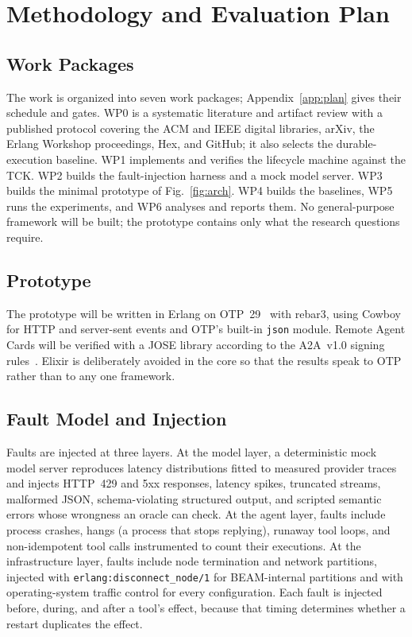 \documentclass[conference,letterpaper]{IEEEtran}
\newcommand{\code}[1]{\texttt{#1}}
\begin{document}
\section{Methodology and Evaluation Plan}\label{sec:method}

\subsection{Work Packages}

The work is organized into seven work packages; Appendix~\ref{app:plan}
gives their schedule and gates. WP0 is a systematic literature and artifact
review with a published protocol covering the ACM and IEEE digital
libraries, arXiv, the Erlang Workshop proceedings, Hex, and GitHub; it also
selects the durable-execution baseline. WP1 implements and verifies the
lifecycle machine against the TCK. WP2 builds the fault-injection harness
and a mock model server. WP3 builds the minimal prototype of
Fig.~\ref{fig:arch}. WP4 builds the baselines, WP5 runs the experiments,
and WP6 analyses and reports them. No general-purpose framework will be
built; the prototype contains only what the research questions require.

\subsection{Prototype}

The prototype will be written in Erlang on OTP~29~\cite{otp29} with rebar3,
using Cowboy for HTTP and server-sent events and OTP's built-in \code{json}
module. Remote Agent Cards will be verified with a JOSE library according to
the A2A~v1.0 signing rules~\cite{aaif2026}. Elixir is deliberately avoided
in the core so that the results speak to OTP rather than to any one
framework.

\subsection{Fault Model and Injection}\label{sec:faults}

Faults are injected at three layers. At the model layer, a deterministic
mock model server reproduces latency distributions fitted to measured
provider traces and injects HTTP~429 and 5xx responses, latency spikes,
truncated streams, malformed JSON, schema-violating structured output, and
scripted semantic errors whose wrongness an oracle can check. At the agent
layer, faults include process crashes, hangs (a process that stops
replying), runaway tool loops, and non-idempotent tool calls instrumented to
count their executions. At the infrastructure layer, faults include node
termination and network partitions, injected with
\code{erlang:disconnect\_node/1} for BEAM-internal partitions and with
operating-system traffic control for every configuration. Each fault is
injected before, during, and after a tool's effect, because that timing
determines whether a restart duplicates the effect.
\end{document}
